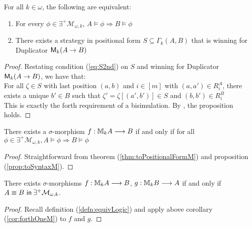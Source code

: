 \begin{prop}
For all $k \in \omega$, the following are equivalent:
\begin{enumerate}[label=(\arabic*)$_{k}$]
\item For every $\phi \in \exists^{+}\mathcal{M}_{\omega,k}$, $A \vDash \phi \Rightarrow B \vDash \phi$
\item There exists a strategy in positional form $S \subseteq \Gamma_{k}(A,B)$ that is winning for Duplicator ${\mathsf{M}_{k}(A \rightarrow B)}$
\end{enumerate}
\begin{proof}
Restating condition (\ref{eq:S2nd}) on $S$ and winning for Duplicator ${\mathsf{M}_{k}(A \rightarrow B)}$, we have that: \\
For all $\zeta \in S$ with last position $(a,b)$ and $i \in [m]$ with $(a,a') \in R_{i}^{A}$, there exists a unique $b' \in B$ such that $\zeta' = \zeta[(a',b')] \in S$ and $(b,b') \in R_{i}^{B}$ \\
This is exactly the forth requirement of a bisimulation. By \cite[Theorem 18]{Barwise1999}, the proposition holds.
\end{proof}
\begin{cor}
There exists a $\sigma$-morphism $f:{\mathbb{M}_{k}A} \longrightarrow B$ if and only if for all $\phi \in \exists^{+}\mathcal{M}_{\omega,k}, A \vDash \phi \Rightarrow B \vDash \phi$
\begin{proof}
Straightforward from theorem (\ref{thm:toPositionalFormM}) and proposition (\ref{prop:toSyntaxM}).
\end{proof}
\label{cor:forthOneM}
\end{cor}
\begin{cor}
There exists $\sigma$-morphisms $f:{\mathbb{M}_{k}A} \longrightarrow B$, $g:{\mathbb{M}_{k}B} \longrightarrow A$ if and only if ${A \equiv B \ \mathsf{in}\: \exists^{+}\mathcal{M}_{\omega,k}}$. 
\begin{proof}
Recall definition (\ref{defn:equivLogic}) and apply above corollary (\ref{cor:forthOneM}) to $f$ and $g$.  
\end{proof}
\label{cor:forthM}
\end{cor}
\label{prop:toSyntaxM}
\end{prop}

